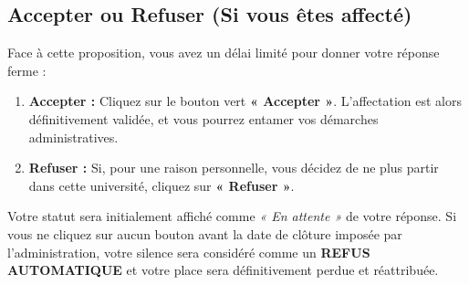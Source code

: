 \documentclass[12pt,a4paper]{article}
\begin{document}
\subsection{Accepter ou Refuser (Si vous êtes affecté)}
Face à cette proposition, vous avez un délai limité pour donner votre réponse ferme :
\begin{enumerate}
    \item \textbf{Accepter :} Cliquez sur le bouton vert \textbf{« Accepter »}. L'affectation est alors définitivement validée, et vous pourrez entamer vos démarches administratives.
    \item \textbf{Refuser :} Si, pour une raison personnelle, vous décidez de ne plus partir dans cette université, cliquez sur \textbf{« Refuser »}.
\end{enumerate}

\begin{tcolorbox}[colback=red!5!white,colframe=red!75!black,title=⚠️ ATTENTION AU DÉLAI DE RÉPONSE]
Votre statut sera initialement affiché comme \textit{« En attente »} de votre réponse. Si vous ne cliquez sur aucun bouton avant la date de clôture imposée par l'administration, votre silence sera considéré comme un \textbf{REFUS AUTOMATIQUE} et votre place sera définitivement perdue et réattribuée.
\end{tcolorbox}
\end{document}
